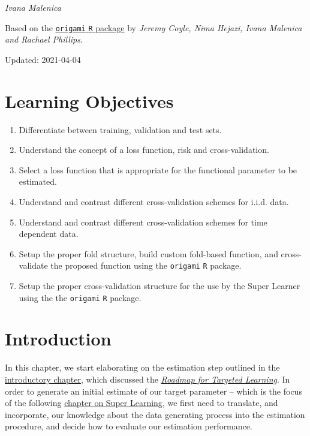 \documentclass[12pt, krantz2,]{book}
\providecommand{\tightlist}{%
  \setlength{\itemsep}{0pt}\setlength{\parskip}{0pt}}
\theoremstyle{definition}
\theoremstyle{definition}
\theoremstyle{definition}
\newcommand{\1}{\mathbbm{1}}
\begin{document}
\emph{Ivana Malenica}

Based on the \href{https://github.com/tlverse/origami}{\texttt{origami} \texttt{R} package}
by \emph{Jeremy Coyle, Nima Hejazi, Ivana Malenica and Rachael Phillips}.

Updated: 2021-04-04

\hypertarget{learning-objectives-2}{%
\section{Learning Objectives}\label{learning-objectives-2}}

\begin{enumerate}
\def\labelenumi{\arabic{enumi}.}
\tightlist
\item
  Differentiate between training, validation and test sets.
\item
  Understand the concept of a loss function, risk and cross-validation.
\item
  Select a loss function that is appropriate for the functional parameter to be
  estimated.
\item
  Understand and contrast different cross-validation schemes for i.i.d. data.
\item
  Understand and contrast different cross-validation schemes for time dependent
  data.
\item
  Setup the proper fold structure, build custom fold-based function, and
  cross-validate the proposed function using the \texttt{origami} \texttt{R} package.
\item
  Setup the proper cross-validation structure for the use by the Super Learner
  using the the \texttt{origami} \texttt{R} package.
\end{enumerate}

\hypertarget{introduction-1}{%
\section{Introduction}\label{introduction-1}}

In this chapter, we start elaborating on the estimation step outlined in the
\protect\hyperlink{intro}{introductory chapter}, which discussed the \protect\hyperlink{roadmap}{\emph{Roadmap for Targeted
Learning}}. In order to generate an initial estimate of our target
parameter -- which is the focus of the following \protect\hyperlink{sl3}{chapter on Super
Learning}, we first need to translate, and incorporate, our knowledge
about the data generating process into the estimation procedure, and decide how
to evaluate our estimation performance.
\end{document}
